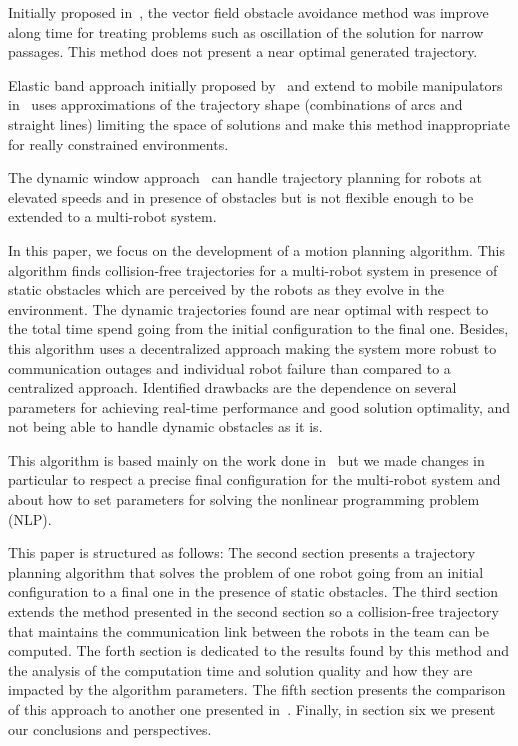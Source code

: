 \documentclass[eprint]{actapoly}
\begin{document}
 

Initially proposed in~\cite{Khatib1986}, the vector field obstacle avoidance 
method was improve along time for treating problems such as oscillation of the 
solution for narrow passages. This method does not present a near optimal 
generated trajectory.

 

Elastic band approach initially proposed by~\cite{Quinlan1994} and extend to 
mobile manipulators in~\cite{Brock et Khatib, 1998} uses approximations of the 
trajectory shape (combinations of arcs and straight lines) limiting the space 
of solutions and make this method inappropriate for really constrained 
environments.

 

The dynamic window approach~\cite{Fox1997} can handle trajectory 
planning for robots at elevated speeds and in presence of obstacles but is not 
flexible enough to be extended to a multi-robot system.

 


In this paper, we focus on the development of a motion planning algorithm. 
This algorithm finds collision-free trajectories for a multi-robot system in 
presence of static obstacles which are perceived by the robots as they evolve 
in the environment. The dynamic trajectories found are near optimal with 
respect to the total time spend going from the initial configuration to the 
final one. Besides, this algorithm uses a decentralized approach making the 
system more robust to communication outages and individual robot failure than 
compared to a centralized approach. Identified drawbacks are the dependence on 
several parameters for achieving real-time performance and good solution 
optimality, and not being able to handle dynamic obstacles as it is.

 

This algorithm is based mainly on the work done in~\cite{Defoort2007a} but we 
made changes in particular to respect a precise final configuration for the 
multi-robot system and about how to set parameters for solving the nonlinear 
programming problem (NLP).

 


This paper is structured as follows: The second section presents a trajectory 
planning algorithm that solves the problem of one robot going from an initial 
configuration to a final one in the presence of static obstacles. The third 
section extends the method presented in the second section so a collision-free 
trajectory that maintains the communication link between the robots in the 
team can be computed. The forth section is dedicated to the results found by 
this method and the analysis of the computation time and solution quality and 
how they are impacted by the algorithm parameters. The fifth section presents 
the comparison of this approach to another one presented in~\cite{}. Finally, in 
section six we present our conclusions and perspectives.
\end{document}

